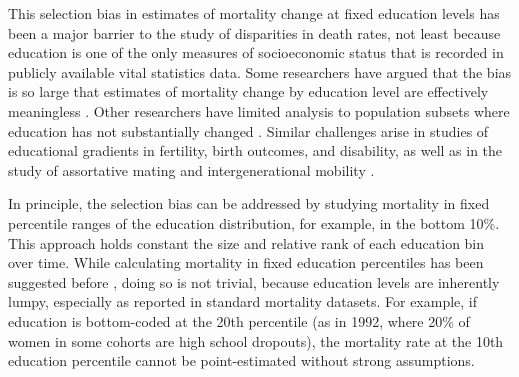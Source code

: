 \documentclass[12pt,letterpaper]{article}
\numberwithin{equation}{section}
\begin{document}
This selection bias in estimates of mortality change at fixed
education levels has been a major barrier to the study of disparities
in death rates, not least because education is one of the only
measures of socioeconomic status that is recorded in publicly
available vital statistics data. Some researchers have argued that the bias is so large that estimates of mortality change by education level are effectively meaningless \citep{Dowd2014,Bound2015,Currie2018}. Other researchers have limited analysis to population subsets where education has not substantially changed \citep{Case2015,Case2017}. Similar challenges arise in studies of educational gradients in fertility, birth outcomes, and disability, as well as in the study of assortative mating and intergenerational mobility \citep{Cutler2010a,Aizer2014,greenwood2014,Bertrand2016,anr2019mob}.

In principle, the selection bias can be addressed by studying mortality in fixed percentile ranges of the education distribution, for example, in the bottom 10\%. This approach holds constant the size and relative rank of each education bin over time. While calculating mortality in fixed education percentiles has been suggested before \citep{Bound2015}, doing so is not trivial, because education levels are inherently lumpy, especially as reported in standard mortality datasets. For example, if education is bottom-coded at the 20th percentile (as in 1992, where 20\% of women in some cohorts are high school dropouts), the mortality rate at the 10th education percentile cannot be point-estimated without strong assumptions.
\end{document}
